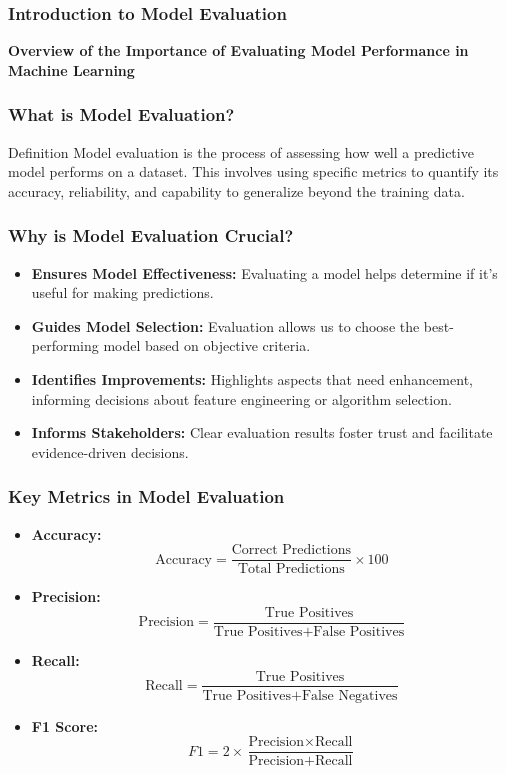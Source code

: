 \documentclass[aspectratio=169]{beamer}
\begin{document}
\frame{\titlepage}

\begin{frame}[fragile]
    \frametitle{Introduction to Model Evaluation}
    \textbf{Overview of the Importance of Evaluating Model Performance in Machine Learning}
\end{frame}

\begin{frame}[fragile]
    \frametitle{What is Model Evaluation?}
    \begin{block}{Definition}
        Model evaluation is the process of assessing how well a predictive model performs on a dataset. 
        This involves using specific metrics to quantify its accuracy, reliability, and capability to generalize beyond the training data.
    \end{block}
\end{frame}

\begin{frame}[fragile]
    \frametitle{Why is Model Evaluation Crucial?}
    \begin{itemize}
        \item \textbf{Ensures Model Effectiveness:} 
        Evaluating a model helps determine if it's useful for making predictions.
        
        \item \textbf{Guides Model Selection:}
        Evaluation allows us to choose the best-performing model based on objective criteria.
        
        \item \textbf{Identifies Improvements:}
        Highlights aspects that need enhancement, informing decisions about feature engineering or algorithm selection.
        
        \item \textbf{Informs Stakeholders:}
        Clear evaluation results foster trust and facilitate evidence-driven decisions.
    \end{itemize}
\end{frame}

\begin{frame}[fragile]
    \frametitle{Key Metrics in Model Evaluation}
    \begin{itemize}
        \item \textbf{Accuracy:} 
        \[
        \text{Accuracy} = \frac{\text{Correct Predictions}}{\text{Total Predictions}} \times 100 
        \]
        
        \item \textbf{Precision:} 
        \[
        \text{Precision} = \frac{\text{True Positives}}{\text{True Positives} + \text{False Positives}} 
        \]
        
        \item \textbf{Recall:} 
        \[
        \text{Recall} = \frac{\text{True Positives}}{\text{True Positives} + \text{False Negatives}} 
        \]
        
        \item \textbf{F1 Score:} 
        \[
        F1 = 2 \times \frac{\text{Precision} \times \text{Recall}}{\text{Precision} + \text{Recall}}
        \]
    \end{itemize}
\end{frame}
\end{document}
